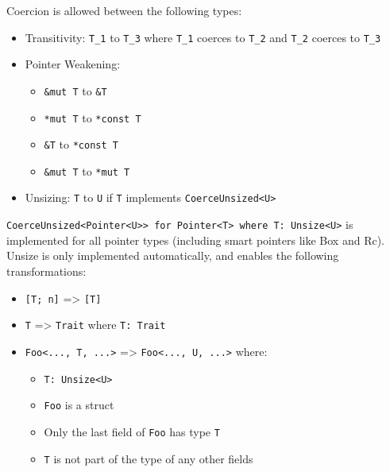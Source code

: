 \documentclass[a4paper,]{book}
\begin{document}
Coercion is allowed between the following types:

\begin{itemize}
\itemsep1pt\parskip0pt
\item
  Transitivity: \texttt{T\_1} to \texttt{T\_3} where \texttt{T\_1}
  coerces to \texttt{T\_2} and \texttt{T\_2} coerces to \texttt{T\_3}
\item
  Pointer Weakening:

  \begin{itemize}
  \itemsep1pt\parskip0pt
  \item
    \texttt{\&mut\ T} to \texttt{\&T}
  \item
    \texttt{*mut\ T} to \texttt{*const\ T}
  \item
    \texttt{\&T} to \texttt{*const\ T}
  \item
    \texttt{\&mut\ T} to \texttt{*mut\ T}
  \end{itemize}
\item
  Unsizing: \texttt{T} to \texttt{U} if \texttt{T} implements
  \texttt{CoerceUnsized\textless{}U\textgreater{}}
\end{itemize}

\texttt{CoerceUnsized\textless{}Pointer\textless{}U\textgreater{}\textgreater{}\ for\ Pointer\textless{}T\textgreater{}\ where\ T:\ Unsize\textless{}U\textgreater{}}
is implemented for all pointer types (including smart pointers like Box
and Rc). Unsize is only implemented automatically, and enables the
following transformations:

\begin{itemize}
\itemsep1pt\parskip0pt
\item
  \texttt{{[}T;\ n{]}} =\textgreater{} \texttt{{[}T{]}}
\item
  \texttt{T} =\textgreater{} \texttt{Trait} where \texttt{T:\ Trait}
\item
  \texttt{Foo\textless{}...,\ T,\ ...\textgreater{}} =\textgreater{}
  \texttt{Foo\textless{}...,\ U,\ ...\textgreater{}} where:

  \begin{itemize}
  \itemsep1pt\parskip0pt
  \item
    \texttt{T:\ Unsize\textless{}U\textgreater{}}
  \item
    \texttt{Foo} is a struct
  \item
    Only the last field of \texttt{Foo} has type \texttt{T}
  \item
    \texttt{T} is not part of the type of any other fields
  \end{itemize}
\end{itemize}
\end{document}
